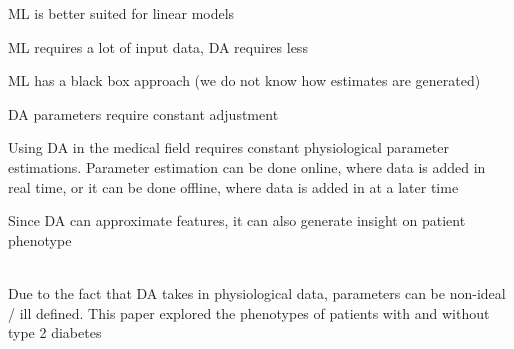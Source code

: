 \documentclass{article}
\begin{document}
\begin{description}
\begin{description}[labelindent=1cm]
        \item[$\bullet$] ML is better suited for linear models \cite{article1}
        \item[$\bullet$] ML requires a lot of input data, DA requires less \cite{article1}
        \item[$\bullet$] ML has a black box approach (we do not know how estimates are generated)
        \item[$\bullet$] DA parameters require constant adjustment \cite{article1}
  \end{description}
  \item[$\bullet$] Using DA in the medical field requires constant physiological parameter estimations. Parameter estimation can be done online, where data is added in real time, or it can be done offline, where data is added in at a later time \cite{article1}
  \item[$\bullet$] Since DA can approximate features, it can also generate insight on patient phenotype \\ \\
  \item[$\bullet$]Due to the fact that DA takes in physiological data, parameters can be non-ideal / ill defined. This paper explored the phenotypes of patients with and without type 2 diabetes \cite{article1}
\end{description}
\end{document}
